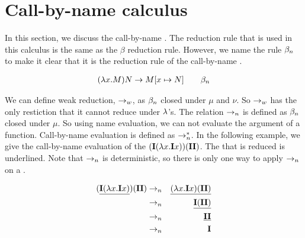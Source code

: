 
\section{Call-by-name calculus}
In this section, we discuss the call-by-name \lc. 
The reduction rule that is used in this calculus is the same as the $\beta$ reduction rule.
However, we name the rule $\beta_n$ to make it clear that it is the reduction rule of the call-by-name \lc.

\begin{align*}
	(\lambda {x}.{M})N \to M [{x}\mapsto{N}] \quad \quad \beta_n
\end{align*}

We can define weak reduction, $\to_w$, as $\beta_n$ closed under $\mu$ and $\nu$. So $\to_w$ has the only restiction that it cannot reduce under $\lambda$'s.
The relation $\to_n$ is defined as $\beta_n$ closed under $\mu$. So using name evaluation, we can not evaluate the argument of a function. 
Call-by-name evaluation is defined as $\to_n^*$. In the following example, we give the call-by-name evaluation of the \lterm $(\mathbf{I}(\lambda {x}.{\mathbf{I} x}))(\mathbf{I} \mathbf{I})$.
The \bre that is reduced is underlined.
Note that $\to_n$ is deterministic, so there is only one way to apply $\to_n$ on a \lterm.

\begin{eqnarray*}
	(\underline{\mathbf{I}(\lambda {x}.{\mathbf{I} x})})(\mathbf{I} \mathbf{I}) &\to_n& \underline{(\lambda {x}.{\mathbf{I} x}) (\mathbf{I} \mathbf{I})} \\
	&\to_n& \underline{\mathbf{I} (\mathbf{I} \mathbf{I})} \\
	&\to_n& \underline{\mathbf{I} \mathbf{I}} \\
	&\to_n& \mathbf{I} 
\end{eqnarray*}
